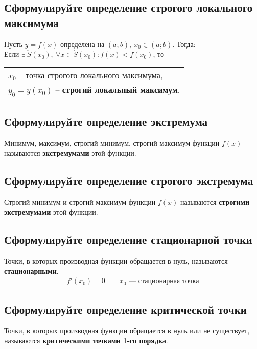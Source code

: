 \subsection{Сформулируйте определение строгого локального максимума}
\begin{definition}
	Пусть $y=f(x)$ определена на $(a;b),\ x_0 \in (a;b)$. Тогда:\\[1ex]
	Если $\exists\ \mathring{S}(x_0),\ \forall x \in \mathring{S}(x_0)\colon f(x) < f(x_0)$, то\hspace{-2pt} \begin{tabular}{l} $x_0$ -- \small{точка строгого локального максимума}, \\ $y_0 = y(x_0)$ -- \small{\textbf{строгий локальный максимум}}. \end{tabular}
\end{definition}

\subsection{Сформулируйте определение экстремума}
\begin{definition}
    Минимум, максимум, строгий минимум, строгий максимум функции $f(x)$ называются \textbf{экстремумами} этой функции.
\end{definition}

\subsection{Сформулируйте определение строгого экстремума}
\begin{definition}
    Строгий минимум и строгий максимум функции $f(x)$ называются \textbf{строгими экстремумами} этой функции.
\end{definition}

\subsection{Сформулируйте определение стационарной точки}
\begin{definition}
	Точки, в которых производная функции обращается в нуль, называются \textbf{стационарными}.
	\begin{gather*}
		f'(x_0) = 0\qquad x_0 \text{ --- стационарная точка}
	\end{gather*}
\end{definition}

\subsection{Сформулируйте определение критической точки}
\begin{definition}
	Точки, в которых производная функции обращается в нуль или не существует, называются \textbf{критическими точками 1-го порядка}.
\end{definition}

